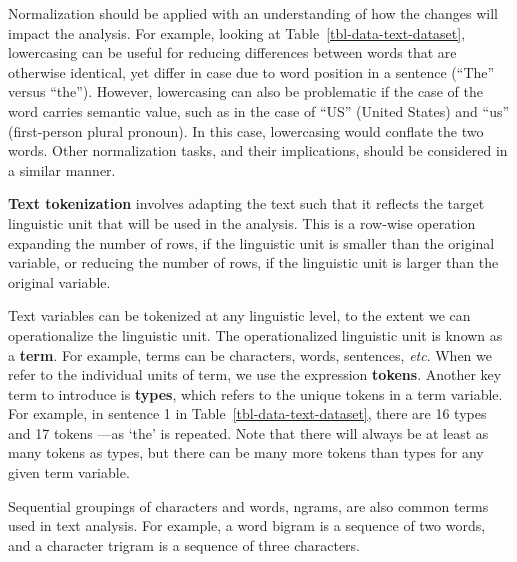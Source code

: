 \documentclass[
  letterpaper,
  krantz1]{latex/krantz-mod}
\theoremstyle{definition}
\theoremstyle{definition}
\theoremstyle{remark}
\begin{document}
Normalization should be applied with an understanding of how the changes
will impact the analysis. For example, looking at
Table~\ref{tbl-data-text-dataset}, lowercasing can be useful for
reducing differences between words that are otherwise identical, yet
differ in case due to word position in a sentence (``The'' versus
``the''). However, lowercasing can also be problematic if the case of
the word carries semantic value, such as in the case of ``US'' (United
States) and ``us'' (first-person plural pronoun). In this case,
lowercasing would conflate the two words. Other normalization tasks, and
their implications, should be considered in a similar manner.

\textbf{Text tokenization} involves adapting
the text such that it reflects the target linguistic unit that will be
used in the analysis. This is a row-wise operation expanding the number
of rows, if the linguistic unit is smaller than the original variable,
or reducing the number of rows, if the linguistic unit is larger than
the original variable.

Text variables can be tokenized at any linguistic level, to the extent
we can operationalize the linguistic unit. The
operationalized linguistic unit is known as a
\textbf{term}. For example, terms can be characters, words,
sentences, \emph{etc}. When we refer to the individual units of term, we
use the expression \textbf{tokens}. Another key term to
introduce is \textbf{types}, which refers to the unique
tokens in a term variable. For example, in sentence 1 in
Table~\ref{tbl-data-text-dataset}, there are 16 types and 17 tokens
---as `the' is repeated. Note that there will always be at least as many
tokens as types, but there can be many more tokens than types for any
given term variable.

Sequential groupings of characters and words, ngrams, are
also common terms used in text analysis. For example, a word bigram is a
sequence of two words, and a character trigram is a sequence of three
characters.
\end{document}
